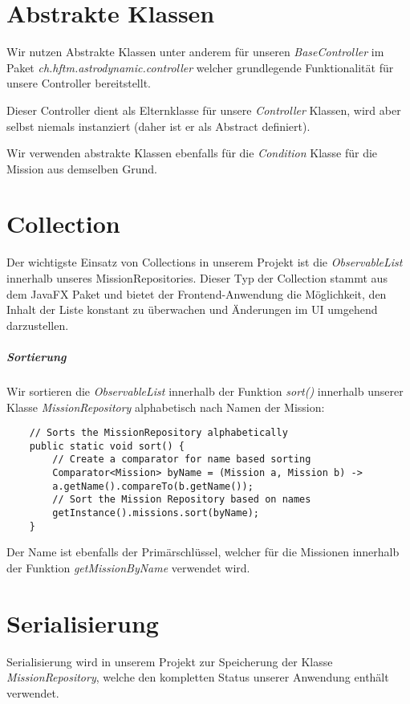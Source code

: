 \section{Abstrakte Klassen}

Wir nutzen Abstrakte Klassen unter anderem für unseren \textit{BaseController} im Paket \textit{ch.hftm.astrodynamic.controller} welcher grundlegende Funktionalität für unsere Controller bereitstellt.

Dieser Controller dient als Elternklasse für unsere \textit{Controller} Klassen, wird aber selbst niemals instanziert (daher ist er als Abstract definiert).

Wir verwenden abstrakte Klassen ebenfalls für die \textit{Condition} Klasse für die Mission aus demselben Grund.

\section{Collection}

Der wichtigste Einsatz von Collections in unserem Projekt ist die \textit{ObservableList} innerhalb unseres MissionRepositories.
Dieser Typ der Collection stammt aus dem JavaFX Paket und bietet der Frontend-Anwendung die Möglichkeit, den Inhalt der Liste konstant zu überwachen und Änderungen im UI umgehend darzustellen.


\subparagraph{Sortierung}

Wir sortieren die \textit{ObservableList} innerhalb der Funktion \textit{sort()} innerhalb unserer Klasse \textit{MissionRepository} alphabetisch nach Namen der Mission:


\begin{lstlisting}
	// Sorts the MissionRepository alphabetically
	public static void sort() {
		// Create a comparator for name based sorting 
		Comparator<Mission> byName = (Mission a, Mission b) ->
		a.getName().compareTo(b.getName());
		// Sort the Mission Repository based on names
		getInstance().missions.sort(byName);
	}
\end{lstlisting}

Der Name ist ebenfalls der Primärschlüssel, welcher für die Missionen innerhalb der Funktion \textit{getMissionByName} verwendet wird.

\section{Serialisierung}

Serialisierung wird in unserem Projekt zur Speicherung der Klasse \textit{MissionRepository}, welche den kompletten Status unserer Anwendung enthält verwendet.


